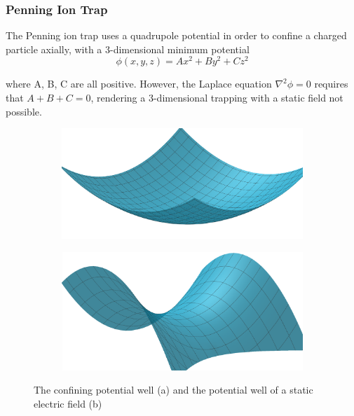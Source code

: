 \documentclass[../main.tex]{subfiles}
\begin{document}
\subsubsection{Penning Ion Trap}
The Penning ion trap uses a quadrupole potential in order to confine a charged particle axially, with a 3-dimensional minimum potential
\begin{equation}
    \phi(x,y,z) = Ax^2 + By^2 + Cz^2
\end{equation}

\noindent where A, B, C are all positive. However, the Laplace equation $\nabla^2 \phi = 0$ requires that $A + B + C = 0$, rendering a 3-dimensional trapping with a static field not possible. 

\begin{figure}[ht!]
    \centering
    \begin{subfigure}{0.45\textwidth}
        \includegraphics[scale = 0.15]{images/desired potential well.png}
        \caption{}
        \label{fig: desired potential well}
    \end{subfigure}
    \begin{subfigure}{0.45\textwidth}
        \includegraphics[scale = 0.15]{images/actual potential well.png}
        \caption{}
        \label{fig: actual potential well}
    \end{subfigure}
    \caption{The confining potential well (a) and the potential well of a static electric field (b)} 
\end{figure}
\end{document}
